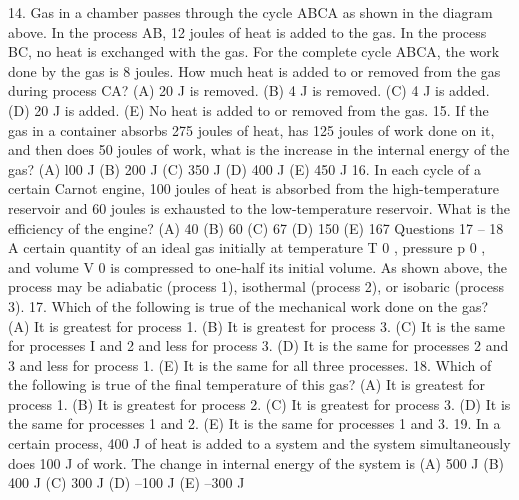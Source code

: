 14. Gas in a chamber passes through the cycle ABCA as shown in the diagram above. In the process AB, 12 joules
of heat is added to the gas. In the process BC, no heat is exchanged with the gas. For the complete cycle
ABCA, the work done by the gas is 8 joules. How much heat is added to or removed from the gas during
process CA?
(A) 20 J is removed.
(B) 4 J is removed.
(C) 4 J is added.
(D) 20 J is added.
(E) No heat is added to or removed from the gas.
15. If the gas in a container absorbs 275 joules of heat, has 125 joules of work done on it, and then does 50 joules of
work, what is the increase in the internal energy of the gas?
(A) l00 J
(B) 200 J
(C) 350 J
(D) 400 J
(E) 450 J
16. In each cycle of a certain Carnot engine, 100 joules of heat is absorbed from the high-temperature reservoir and
60 joules is exhausted to the low-temperature reservoir. What is the efficiency of the engine?
(A) 40%
(B) 60%
(C) 67%
(D) 150%
(E) 167%
Questions 17 – 18
A certain quantity of an ideal gas initially at temperature T 0 , pressure p 0 , and volume V 0 is compressed to
one-half its initial volume. As shown above, the process may be adiabatic (process 1), isothermal (process 2), or
isobaric (process 3).
17. Which of the following is true of the mechanical work done on the gas?
(A) It is greatest for process 1.
(B) It is greatest for process 3.
(C) It is the same for processes I and 2 and less for process 3.
(D) It is the same for processes 2 and 3 and less for process 1.
(E) It is the same for all three processes.
18. Which of the following is true of the final temperature of this gas?
(A) It is greatest for process 1.
(B) It is greatest for process 2.
(C) It is greatest for process 3.
(D) It is the same for processes 1 and 2.
(E) It is the same for processes 1 and 3.
19. In a certain process, 400 J of heat is added to a system and the system simultaneously does 100 J of work. The
change in internal energy of the system is
(A) 500 J
(B) 400 J
(C) 300 J
(D) –100 J
(E) –300 J



